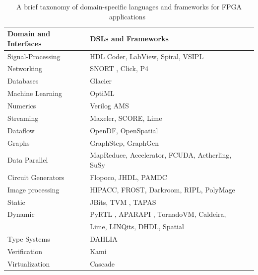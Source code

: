 \begin {table} [h]
	\begin{center}
		\caption {A brief taxonomy of domain-specific languages and frameworks for FPGA applications~\label{DSLs}}
		\begin{tabular}{ | l | l | l | p{0.1cm}|}
			\hline
			\textbf{Domain and Interfaces} &  \textbf{DSLs and Frameworks} \\ \hline  
			Signal-Processing &  HDL Coder, LabView, Spiral, VSIPL  \\            \hline
			Networking  &  SNORT \cite{snort}, Click, P4\\            \hline
			Databases & Glacier  \\ \hline
			Machine Learning & OptiML  \\ \hline 
			Numerics &Verilog
			AMS   \\            \hline
			Streaming & Maxeler, SCORE, Lime  \\            \hline
			Dataflow & OpenDF, OpenSpatial  \\            \hline
			Graphs & GraphStep, GraphGen  \\            \hline
			Data Parallel & MapReduce, Accelerator, FCUDA, Aetherling, SuSy  \\            \hline
			Circuit Generators & Flopoco, JHDL, PAMDC  \\            \hline
			Image processing & HIPACC, FROST, Darkroom, RIPL, PolyMage \\            \hline
 			Static &  JBits, TVM \cite{tvm}, TAPAS \\            \hline
				Dynamic &  PyRTL \cite{pyrtl}, APARAPI \cite{arapa}, TornadoVM\cite{tornado}, Caldeira, \\ & Lime,
		LINQits, DHDL, Spatial \\            \hline
		Type Systems & DAHLIA \\ \hline
		Verification & Kami \\ \hline
		Virtualization & Cascade \\ \hline
		\end{tabular}
	\end{center}
\end {table}

